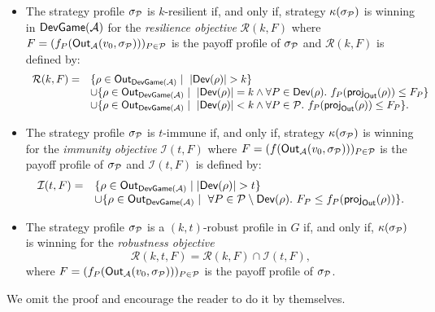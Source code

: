 \begin{itemize}

\item
  The strategy profile \(\sigma_{\mathcal{P}}\) is \(k\)-resilient if, and only
  if, strategy \(\kappa(\sigma_{\mathcal{P}})\) is winning in \(\textsf{DevGame}(\mathcal{A})\) for the
  \emph{resilience objective} \(\mathcal{R}(k,F)\) where
  \(F = (f_P(\textsf{Out}_{\mathcal{A}}(v_0, \sigma_{\mathcal{P}})))_{P \in \mathcal{P}}\) is the payoff profile of
  \(\sigma_{\mathcal{P}}\) and \(\mathcal{R}(k,F)\) is defined by:
  \[
    \begin{array}{ll}
      \mathcal{R}(k,F) = & \{ \rho \in \Out_{\devg(\mathcal{A})}\mid ~ |\Dev(\rho)| > k \} \\
                          &\cup
                            \{ \rho  \in \Out_{\devg(\mathcal{A})} \mid ~ |\Dev(\rho)| = k \land \forall P \in \Dev(\rho).\ \payoff_{P}(\proj_{\Out}(\rho)) \le F_P\} \\
                          & \cup \{ \rho  \in \Out_{\devg(\mathcal{A})}\mid ~ |\Dev(\rho)| < k \land \forall P \in \Agt.\ \payoff_{P}(\proj_{\Out}(\rho)) \le F_P\}.
    \end{array}
  \]

\item
  The strategy profile \(\sigma_{\mathcal{P}}\) is \(t\)-immune if, and only if,
  strategy \(\kappa(\sigma_{\mathcal{P}})\) is winning for the \emph{immunity
  objective} \(\mathcal{I}(t,F)\) where
  \(F = (f(\textsf{Out}_{\mathcal{A}}(v_0, \sigma_{\mathcal{P}})))_{P \in \mathcal{P}}\) is the payoff profile of
  \(\sigma_{\mathcal{P}}\) and \(\mathcal{I}(t,F)\) is defined by:
  \[
    \begin{array}{ll}
    \mathcal{I}(t,F) = & \{ \rho  \in \textsf{Out}_{\textsf{DevGame}(\mathcal{A})} \mid |\textsf{Dev}(\rho)| > t \}  \\
      & \cup \{ \rho  \in \textsf{Out}_{\textsf{DevGame}(\mathcal{A})} \mid ~ \forall P \in \mathcal{P} \setminus \textsf{Dev}(\rho).\  F_P \le f_{P}(\textsf{proj}_{\textsf{Out}}(\rho)) \}.
    \end{array}
  \]
\item
  The strategy profile \(\sigma_{\mathcal{P}}\) is a \((k,t)\)-robust profile in
  \(G\) if, and only if, \(\kappa(\sigma_{\mathcal{P}})\) is winning for the
  \emph{robustness objective}
  \[
        \mathcal{R}(k,t,F)= \mathcal{R}(k,F) \cap \mathcal{I}(t,F),
        \] where
        \(F = (f_P(\textsf{Out}_{\mathcal{A}}(v_0, \sigma_{\mathcal{P}})))_{P \in \mathcal{P}}\) is the payoff profile of
        \(\sigma_{\mathcal{P}}\).
\end{itemize}

We omit the proof and encourage the reader to do it by themselves.

